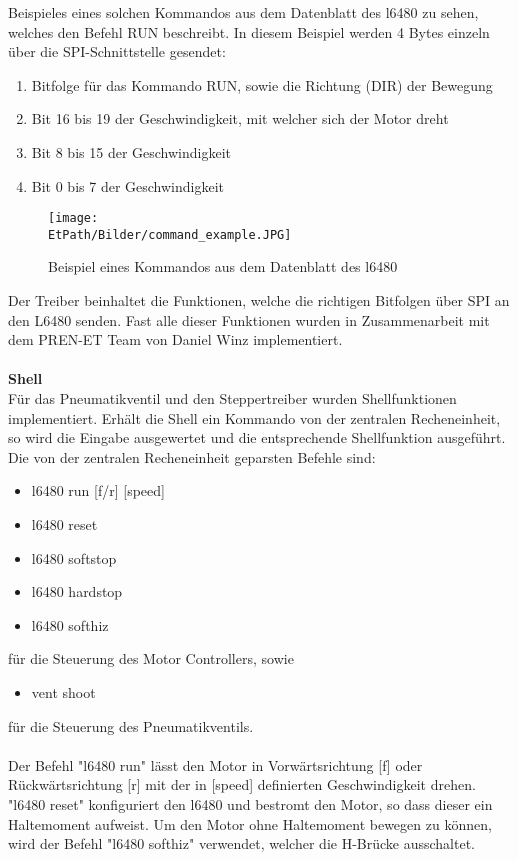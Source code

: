     Beispieles eines solchen Kommandos aus dem Datenblatt des l6480 zu sehen, 
    welches den Befehl RUN beschreibt. In diesem Beispiel werden 4 Bytes 
    einzeln über die SPI-Schnittstelle gesendet: 
    \begin{enumerate}
        \item Bitfolge für das Kommando RUN, sowie die Richtung (DIR) der Bewegung
        \item Bit 16 bis 19 der Geschwindigkeit, mit welcher sich der Motor dreht
        \item Bit 8 bis 15 der Geschwindigkeit
        \item Bit 0 bis 7 der Geschwindigkeit
    \end{enumerate}
    \begin{figure}[h!]
        \centering
        \texttt{[image: \\EtPath/Bilder/command\_example.JPG]}
        \caption{Beispiel eines Kommandos aus dem Datenblatt des l6480}
        \label{fig:command}
    \end{figure}
    Der Treiber beinhaltet die Funktionen, welche die richtigen Bitfolgen über 
    SPI an den L6480 senden. Fast alle dieser Funktionen wurden in 
    Zusammenarbeit mit dem PREN-ET Team von Daniel Winz implementiert.  
    \\\\
    \textbf{Shell}\\
    Für das Pneumatikventil und den Steppertreiber wurden Shellfunktionen 
    implementiert. Erhält die Shell ein Kommando von der zentralen 
    Recheneinheit, so wird die Eingabe ausgewertet und die entsprechende 
    Shellfunktion ausgeführt. Die von der zentralen Recheneinheit geparsten 
    Befehle sind:  
    \begin{itemize}
        \item l6480 run [f/r] [speed]
        \item l6480 reset
        \item l6480 softstop
        \item l6480 hardstop
        \item l6480 softhiz
    \end{itemize}
    für die Steuerung des Motor Controllers, sowie
    \begin{itemize}
        \item vent shoot
    \end{itemize}
    für die Steuerung des Pneumatikventils. 
    \\\\
    Der Befehl "l6480 run" lässt den Motor in Vorwärtsrichtung [f] oder 
    Rückwärtsrichtung [r] mit der in [speed] definierten Geschwindigkeit 
    drehen. "l6480 reset" konfiguriert den l6480 und bestromt den Motor, so 
    dass dieser ein Haltemoment aufweist. Um den Motor ohne Haltemoment 
    bewegen zu können, wird der Befehl "l6480 softhiz" verwendet, welcher die 
    H-Brücke ausschaltet. 
    
